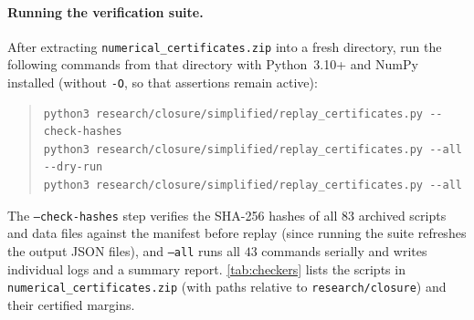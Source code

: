 \documentclass[11pt]{article}
\numberwithin{equation}{section}
\theoremstyle{plain}
\theoremstyle{definition}
\newcommand{\1}{\mathbf{1}}
\begin{document}
\paragraph{Running the verification suite.}
After extracting \texttt{numerical\_certificates.zip} into a fresh directory, run the following commands from that directory with Python~3.10+ and NumPy installed (without \texttt{-O}, so that assertions remain active):
\begin{quote}\small
\begin{verbatim}
python3 research/closure/simplified/replay_certificates.py --check-hashes
python3 research/closure/simplified/replay_certificates.py --all --dry-run
python3 research/closure/simplified/replay_certificates.py --all
\end{verbatim}
\end{quote}
The \texttt{--check-hashes} step verifies the SHA-256 hashes of all $83$ archived scripts and data files against the manifest before replay (since running the suite refreshes the output JSON files), and \texttt{--all} runs all $43$ commands serially and writes individual logs and a summary report. \cref{tab:checkers} lists the scripts in \texttt{numerical\_certificates.zip} (with paths relative to \texttt{research/closure}) and their certified margins.
\end{document}
